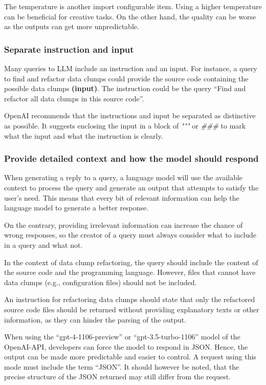 The temperature is another import configurable item. Using a higher temperature can be beneficial for creative tasks. On the other hand, the quality can be worse as the outputs can get more unpredictable. 




\subsubsection{Separate instruction and input}
Many queries to \ac{LLM} include an instruction and an input. For instance, a query to find and refactor data clumps could provide the source code containing the possible data clumps \textbf{(input)}. The instruction could be the query \enquote{Find and refactor all data clumps in this source code}. 

OpenAI recommends that the instructions and input be separated as distinctive as possible. It suggests enclosing the input in a block of \textit{"""} or \textit{\#\#\#} to mark what the input and what the instruction is clearly.

\subsubsection{Provide detailed context and how the model should respond}

When generating a reply to a query, a language model will use the available context to process the query and generate an output that attempts to satisfy the user's need. This means that every bit of relevant information can help the language model to generate a better response.

On the contrary, providing irrelevant information can increase the chance of wrong responses, so the creator of a query must always consider what to include in a query and what not. 

In the context of data clump refactoring, the query should include the content of the source code and the programming language. However, files that cannot have data clumps (e.g., configuration files) should not be included.

An instruction for refactoring data clumps should state that only the refactored source code files should be returned without providing explanatory texts or other information, as they can hinder the parsing of the output. 

When using the \enquote{gpt-4-1106-preview} or \enquote{gpt-3.5-turbo-1106} model of the OpenAI-\ac{API}, developers can force the model to respond in \ac{JSON}. Hence, the output can be made more predictable and easier to control. A request using this mode must include the term \enquote{\ac{JSON}}. It should however be noted, that the precise structure of the \ac{JSON} returned may still differ from the request. 


